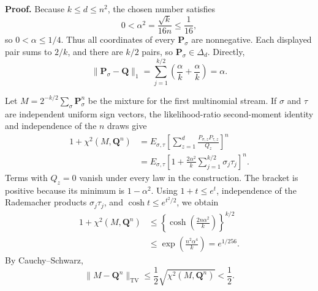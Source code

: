 \textbf{Proof.}
Because \(k\le d\le n^2\), the chosen number satisfies
\[
 0<\alpha^2=\frac{\sqrt{k}}{16n}\le\frac1{16},
\]
so \(0<\alpha\le1/4\).  Thus all coordinates of every \(\mathbf P_\sigma\) are nonnegative.  Each displayed pair sums to \(2/k\), and there are \(k/2\) pairs, so \(\mathbf P_\sigma\in\Delta_d\).  Directly,
\[
 \lVert\mathbf P_\sigma-\mathbf Q\rVert_1
 =\sum_{j=1}^{k/2}
   \left(\frac{\alpha}{k}+\frac{\alpha}{k}\right)
 =\alpha.
\]

Let \(M=2^{-k/2}\sum_\sigma\mathbf P_\sigma^n\) be the mixture for the first multinomial stream.  If \(\sigma\) and \(\tau\) are independent uniform sign vectors, the likelihood-ratio second-moment identity and independence of the \(n\) draws give
\[
 \begin{aligned}
 1+\chi^2(M,\mathbf Q^n)
 &=E_{\sigma,\tau}\left[
   \sum_{z=1}^d\frac{P_{\sigma,z}P_{\tau,z}}{Q_z}
  \right]^n\\
 &=E_{\sigma,\tau}\left[
  1+\frac{2\alpha^2}{k}
     \sum_{j=1}^{k/2}\sigma_j\tau_j
  \right]^n.
 \end{aligned}
\]
Terms with \(Q_z=0\) vanish under every law in the construction.  The bracket is positive because its minimum is \(1-\alpha^2\).  Using \(1+t\le e^t\), independence of the Rademacher products \(\sigma_j\tau_j\), and \(\cosh t\le e^{t^2/2}\), we obtain
\[
 \begin{aligned}
 1+\chi^2(M,\mathbf Q^n)
 &\le
 \left\{\cosh\left(\frac{2n\alpha^2}{k}\right)\right\}^{k/2}\\
 &\le \exp\left(\frac{n^2\alpha^4}{k}\right)
 =e^{1/256}.
 \end{aligned}
\]
By Cauchy--Schwarz,
\[
 \lVert M-\mathbf Q^n\rVert_{\mathrm{TV}}
 \le\frac12\sqrt{\chi^2(M,\mathbf Q^n)}<\frac12.
\]

